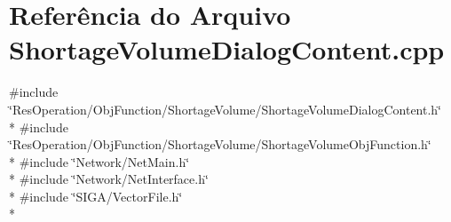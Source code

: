 \section{Referência do Arquivo Shortage\+Volume\+Dialog\+Content.\+cpp}
\label{_obj_function_2_shortage_volume_2_shortage_volume_dialog_content_8cpp}
{\ttfamily \#include \char`\"{}Res\+Operation/\+Obj\+Function/\+Shortage\+Volume/\+Shortage\+Volume\+Dialog\+Content.\+h\char`\"{}}\\*
{\ttfamily \#include \char`\"{}Res\+Operation/\+Obj\+Function/\+Shortage\+Volume/\+Shortage\+Volume\+Obj\+Function.\+h\char`\"{}}\\*
{\ttfamily \#include \char`\"{}Network/\+Net\+Main.\+h\char`\"{}}\\*
{\ttfamily \#include \char`\"{}Network/\+Net\+Interface.\+h\char`\"{}}\\*
{\ttfamily \#include \char`\"{}S\+I\+G\+A/\+Vector\+File.\+h\char`\"{}}\\*

